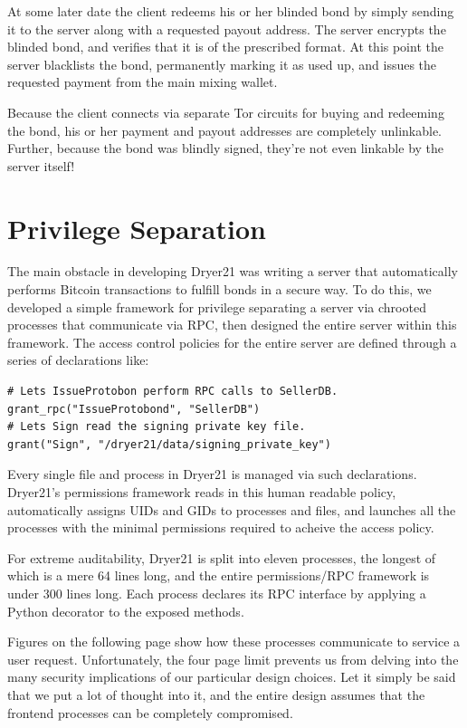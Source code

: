 \documentclass[12pt]{article}
\begin{document}
At some later date the client redeems his or her blinded bond by simply sending it to the server along with a requested payout address.
The server encrypts the blinded bond, and verifies that it is of the prescribed format.
At this point the server blacklists the bond, permanently marking it as used up, and issues the requested payment from the main mixing wallet.

Because the client connects via separate Tor circuits for buying and redeeming the bond, his or her payment and payout addresses are completely unlinkable.
Further, because the bond was blindly signed, they're not even linkable by the server itself!

\section{Privilege Separation}
The main obstacle in developing Dryer21 was writing a server that automatically performs Bitcoin transactions to fulfill bonds in a secure way.
To do this, we developed a simple framework for privilege separating a server via chrooted processes that communicate via RPC, then designed the entire server within this framework.
The access control policies for the entire server are defined through a series of declarations like:
\begin{Verbatim}
# Lets IssueProtobon perform RPC calls to SellerDB.
grant_rpc("IssueProtobond", "SellerDB")
# Lets Sign read the signing private key file.
grant("Sign", "/dryer21/data/signing_private_key")
\end{Verbatim}
Every single file and process in Dryer21 is managed via such declarations.
Dryer21's permissions framework reads in this human readable policy, automatically assigns UIDs and GIDs to processes and files, and launches all the processes with the minimal permissions required to acheive the access policy.

For extreme auditability, Dryer21 is split into eleven processes, the longest of which is a mere 64 lines long, and the entire permissions/RPC framework is under 300 lines long.
Each process declares its RPC interface by applying a Python decorator to the exposed methods.

Figures on the following page show how these processes communicate to service a user request.
Unfortunately, the four page limit prevents us from delving into the many security implications of our particular design choices.
Let it simply be said that we put a lot of thought into it, and the entire design assumes that the frontend processes can be completely compromised.
\end{document}
